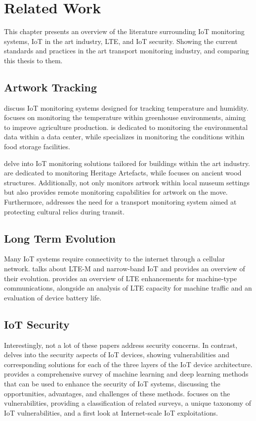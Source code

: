 \chapter{Related Work}
This chapter presents an overview of the literature surrounding IoT monitoring systems, IoT in the art industry, LTE, and IoT security. Showing the current standards and practices in the art transport monitoring industry, and comparing this thesis to them.

\section{Artwork Tracking}
\cite{Ramesh2017, Subahi2020, Rahman2020, Karim2018} discuss IoT monitoring systems designed for tracking temperature and humidity. \cite{Subahi2020} focuses on monitoring the temperature within greenhouse environments, aiming to improve agriculture production. \cite{Rahman2020} is dedicated to monitoring the environmental data within a data center, while \cite{Karim2018} specializes in monitoring the conditions within food storage facilities.

\cite{Shah2016, Prasanth2021, Hinostroza2022, Alsuhly2018, Fort2022} delve into IoT monitoring solutions tailored for buildings within the art industry. \cite{Shah2016, Prasanth2021, Hinostroza2022} are dedicated to monitoring Heritage Artefacts, while \cite{Fort2022} focuses on ancient wood structures.
Additionally, \cite{Fort2022} not only monitors artwork within local museum settings but also provides remote monitoring capabilities for artwork on the move. Furthermore, \cite{Zhang2021} addresses the need for a transport monitoring system aimed at protecting cultural relics during transit.

\section{Long Term Evolution}
Many IoT systems require connectivity to the internet through a cellular network.
\cite{Dian2020} talks about LTE-M and narrow-band IoT and provides an overview of their evolution.
\cite{Ratasuk2015} provides an overview of LTE enhancements for machine-type communications, alongside an analysis of LTE capacity for machine traffic and an evaluation of device battery life.

\section{IoT Security}
Interestingly, not a lot of these papers address security concerns.
In contrast, \cite{Noor2019, Mahmoud2015} delves into the security aspects of IoT devices, showing vulnerabilities and corresponding solutions for each of the three layers of the IoT device architecture.
\cite{Garadi2020} provides a comprehensive survey of machine learning and deep learning methods that can be used to enhance the security of IoT systems, discussing the opportunities, advantages, and challenges of these methods. \cite{Neshenko2019} focuses on the vulnerabilities, providing a classification of related surveys, a unique taxonomy of IoT vulnerabilities, and a first look at Internet-scale IoT exploitations.


